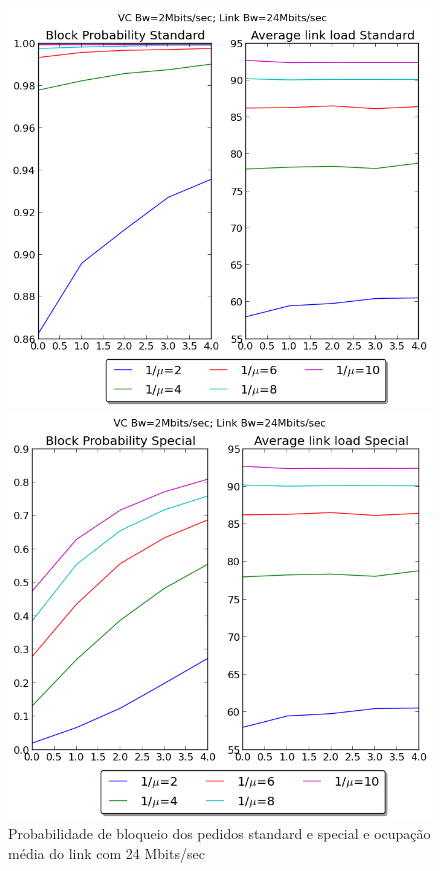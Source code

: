 \documentclass[pdftex,12pt,a4paper]{report}
\begin{document}
\begin{figure}[!htb]
  \centering
  \begin{minipage}[b]{0.4\textwidth}
    \includegraphics[width=\textwidth]{imagensGuia/graphstandard3ex3.png}
  \end{minipage}
  \hfill
  \begin{minipage}[b]{0.4\textwidth}
    \includegraphics[width=\textwidth]{imagensGuia/graphspecial4ex3}
  \end{minipage}
  \caption{Probabilidade de bloqueio dos pedidos standard e special e ocupação média do link com 24 Mbits/sec}
\end{figure}
\end{document}
